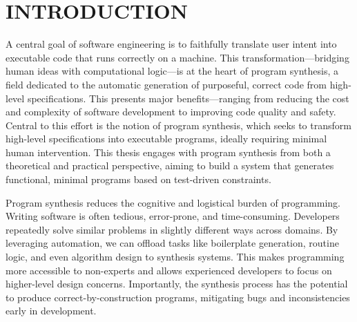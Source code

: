 %
%
%



\chapter{INTRODUCTION}


\indent\indent A central goal of software engineering is to faithfully translate user intent into executable code that runs correctly on a machine. This transformation—bridging human ideas with computational logic—is at the heart of program synthesis, a field dedicated to the automatic generation of purposeful, correct code from high-level specifications. This presents major benefits—ranging from reducing the cost and complexity of software development to improving code quality and safety. Central to this effort is the notion of program synthesis, which seeks to transform high-level specifications into executable programs, ideally requiring minimal human intervention. This thesis engages with program synthesis from both a theoretical and practical perspective, aiming to build a system that generates functional, minimal programs based on test-driven constraints.

\indent\indent Program synthesis reduces the cognitive and logistical burden of programming. Writing software is often tedious, error-prone, and time-consuming. Developers repeatedly solve similar problems in slightly different ways across domains. By leveraging automation, we can offload tasks like boilerplate generation, routine logic, and even algorithm design to synthesis systems. This makes programming more accessible to non-experts and allows experienced developers to focus on higher-level design concerns. Importantly, the synthesis process has the potential to produce correct-by-construction programs, mitigating bugs and inconsistencies early in development.

